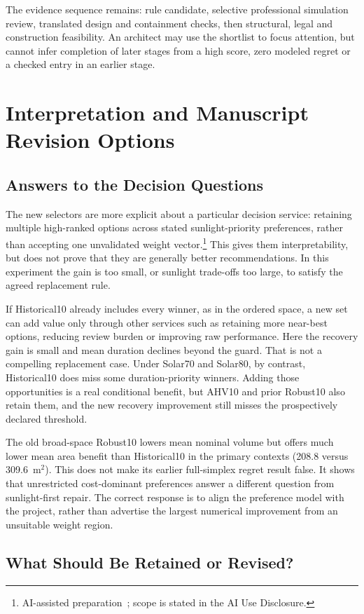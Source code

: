 \documentclass{llncs}
\newcommand{\aidraft}{\footnote{AI-assisted preparation~\cite{openai2026}; scope is stated in the AI Use Disclosure.}}
\begin{document}
The evidence sequence remains: rule candidate, selective professional simulation review, translated design and containment checks, then structural, legal and construction feasibility. An architect may use the shortlist to focus attention, but cannot infer completion of later stages from a high score, zero modeled regret or a checked entry in an earlier stage.

\section{Interpretation and Manuscript Revision Options}
\subsection{Answers to the Decision Questions}
The new selectors are more explicit about a particular decision service: retaining multiple high-ranked options across stated sunlight-priority preferences, rather than accepting one unvalidated weight vector.\aidraft{} This gives them interpretability, but does not prove that they are generally better recommendations. In this experiment the gain is too small, or sunlight trade-offs too large, to satisfy the agreed replacement rule.

If Historical10 already includes every winner, as in the ordered space, a new set can add value only through other services such as retaining more near-best options, reducing review burden or improving raw performance. Here the recovery gain is small and mean duration declines beyond the guard. That is not a compelling replacement case. Under Solar70 and Solar80, by contrast, Historical10 does miss some duration-priority winners. Adding those opportunities is a real conditional benefit, but AHV10 and prior Robust10 also retain them, and the new recovery improvement still misses the prospectively declared threshold.

The old broad-space Robust10 lowers mean nominal volume but offers much lower mean area benefit than Historical10 in the primary contexts (208.8 versus 309.6~m$^2$). This does not make its earlier full-simplex regret result false. It shows that unrestricted cost-dominant preferences answer a different question from sunlight-first repair. The correct response is to align the preference model with the project, rather than advertise the largest numerical improvement from an unsuitable weight region.

\subsection{What Should Be Retained or Revised?}
\end{document}
